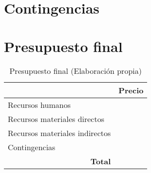 \section{Contingencias}
\label{sec:contingencias}

\section{Presupuesto final}
\label{sec:presupuesto_final}

\begin{table}[H]
    \centering
    \begin{tabular}{|l|l|}
    \hline
    \rowcolor[HTML]{8EA9D8} 
    \multicolumn{1}{|c|}{\cellcolor[HTML]{8EA9D8}\textbf{Resumen}} & \multicolumn{1}{c|}{\cellcolor[HTML]{8EA9D8}\textbf{Precio}} \\ \hline
    Recursos humanos                                               &                                                              \\ \hline
    Recursos materiales directos                                   &                                                              \\ \hline
    Recursos materiales indirectos                                 &                                                              \\ \hline
    Contingencias                                                  &                                                              \\ \hline
    \multicolumn{1}{|r|}{\textbf{Total}}                           & \textbf{}                                                    \\ \hline
    \end{tabular}
    \caption{Presupuesto final (Elaboración propia)}
    \label{tab:presupuesto_final}
\end{table}